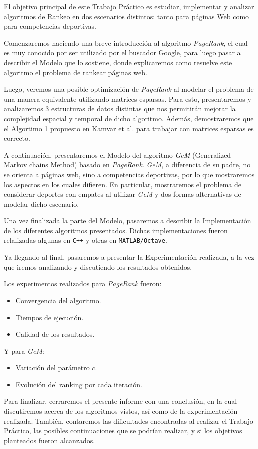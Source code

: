  El objetivo principal de este Trabajo Práctico es estudiar, implementar y analizar
 algoritmos de Rankeo en dos escenarios distintos: tanto para páginas Web como para
 competencias deportivas.

Comenzaremos haciendo una breve introducción al algoritmo \textit{PageRank}, el cual
es muy conocido por ser utilizado por el buscador Google,
 para luego pasar a describir el Modelo que lo sostiene,
donde explicaremos como resuelve este algoritmo el problema de rankear
páginas web.

Luego, veremos una posible optimización de \textit{PageRank} al modelar
el problema de una manera equivalente utilizando matrices esparsas. Para esto,
presentaremos y analizaremos 3 estructuras de datos distintas que nos permitirán mejorar la
complejidad espacial y temporal de dicho algoritmo. Además, demostraremos que el Algortimo 1 propuesto en Kamvar et al.
para trabajar con matrices esparsas es correcto.

A continuación, presentaremos el Modelo del algoritmo \textit{GeM} (Generalized Markov chains Method) basado en
\textit{PageRank}. \textit{GeM}, a diferencia de su padre, no se orienta a páginas web, sino a competencias
deportivas, por lo que mostraremos los aspectos en los cuales difieren.
En particular, mostraremos el problema de considerar deportes con empates al utilizar \textit{GeM} y dos formas
alternativas de modelar dicho escenario.

Una vez finalizada la parte del Modelo, pasaremos a describir la Implementación de los
diferentes algoritmos presentados. Dichas implementaciones fueron relalizadas algunas en
\texttt{C++} y otras en \texttt{MATLAB/Octave}.

Ya llegando al final, pasaremos a presentar la Experimentación realizada, a la vez
que iremos analizando y discutiendo los resultados obtenidos.

Los experimentos realizados para \textit{PageRank} fueron:
\begin{itemize}
    \item Convergencia del algoritmo.
    \item Tiempos de ejecución.
    \item Calidad de los resultados.
\end{itemize}

Y para \textit{GeM}:
\begin{itemize}
    \item Variación del parámetro $c$.
    \item Evolución del ranking por cada iteración.
\end{itemize}

Para finalizar, cerraremos el presente informe con una conclusión, en la cual
discutiremos acerca de los algoritmos vistos, así como de la experimentación realizada.
También, contaremos las dificultades encontradas al realizar el Trabajo Práctico,
las posibles continuaciones que se podrían realizar, y si los objetivos planteados
fueron alcanzados.
